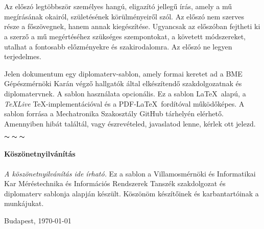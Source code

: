\chapter*{\eloszo}

Az előszó legtöbbször személyes hangú, eligazító jellegű írás, amely a mű megírásának okairól, születésének körülményeiről szól. Az előszó nem szerves része a főszövegnek, hanem annak kiegészítése.
Ugyancsak az előszóban fejtheti ki a szerző a mű megértéséhez szükséges szempontokat, a követett módszereket, utalhat a fontosabb előzményekre és szakirodalomra.
Az előszó ne legyen terjedelmes.


Jelen dokumentum egy diplomaterv-sablon, amely formai keretet ad a BME Gépészmérnöki Karán végző hallgatók által elkészítendő szakdolgozatnak és diplomatervnek. A sablon használata opcionális. Ez a sablon \LaTeX~alapú, a \emph{TeXLive} \TeX-implementációval és a PDF-\LaTeX~fordítóval működőképes.
A sablon forrása a Mechatronika Szakosztály GitHub tárhelyén\footnotemark{} elérhető. Amennyiben hibát találtál, vagy észrevételed, javaslatod lenne, kérlek ott jelezd.


\begin{center}
    $\thicksim \; \thicksim \; \thicksim$
\end{center}


\subsubsection*{Köszönetnyilvánítás}
\emph{A köszönetnyilvánítás ide írható.} Ez a sablon a Villamosmérnöki és Informatikai Kar Méréstechnika és Információs Rendszerek Tanszék szakdolgozat és diplomaterv sablonja alapján készült. Köszönöm készítőinek és karbantartóinak a munkájukat.


\vspace{0.5cm}

\begin{flushleft}
{Budapest, \today}
\end{flushleft}

\begin{flushright}
\emph{\authorName}
\end{flushright}

\vfill
